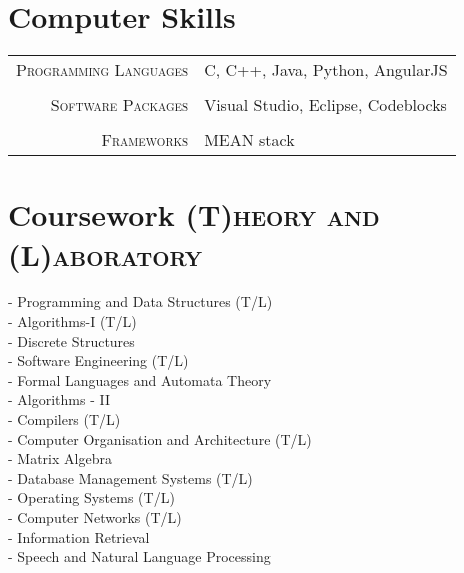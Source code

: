 \documentclass[a4paper,10pt]{article} %
\begin{document}

\section{Computer Skills}

\begin{tabular}{r|p{15cm}}
\textsc{Programming Languages} & C, C++, Java, Python, AngularJS\\
\multicolumn{2}{c}{} \\
\textsc{Software Packages} & Visual Studio, Eclipse, Codeblocks\\
\multicolumn{2}{c}{} \\
\textsc{Frameworks} & MEAN stack\\
\end{tabular}


\section{Coursework
\hfill\small\textsc{(T)heory and (L)aboratory}}

\begin{multicols}{2}

- Programming and Data Structures (T/L) \\
- Algorithms-I (T/L) \\
- Discrete Structures \\
- Software Engineering (T/L) \\
- Formal Languages and Automata Theory \\
- Algorithms - II \\
- Compilers (T/L) \\
- Computer Organisation and Architecture (T/L) \\
- Matrix Algebra \\
- Database Management Systems (T/L) \\
- Operating Systems (T/L) \\
- Computer Networks (T/L) \\
- Information Retrieval\\
- Speech and Natural Language Processing
\end{multicols}
\end{document}
